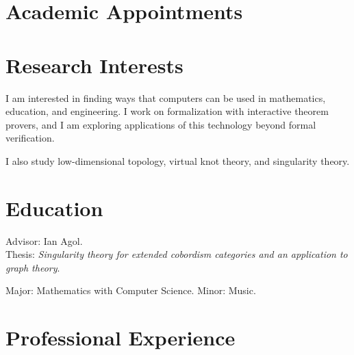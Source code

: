 \documentclass[11pt,letterpaper,roman]{moderncv}
\begin{document}
\maketitle
\vspace{-2em}

\section{Academic Appointments}



\section{Research Interests}

I am interested in finding ways that computers can be used in mathematics, education, and engineering.
I work on formalization with interactive theorem provers, and I am exploring applications of this technology beyond formal verification.

\vspace{0.5em}
I also study low-dimensional topology, virtual knot theory, and singularity theory.


\section{Education}

{Advisor: Ian Agol.\\
Thesis: \emph{Singularity theory for extended cobordism categories and an application to graph theory}.}

{Major: Mathematics with Computer Science. Minor: Music.}

\section{Professional Experience}

\end{document}
